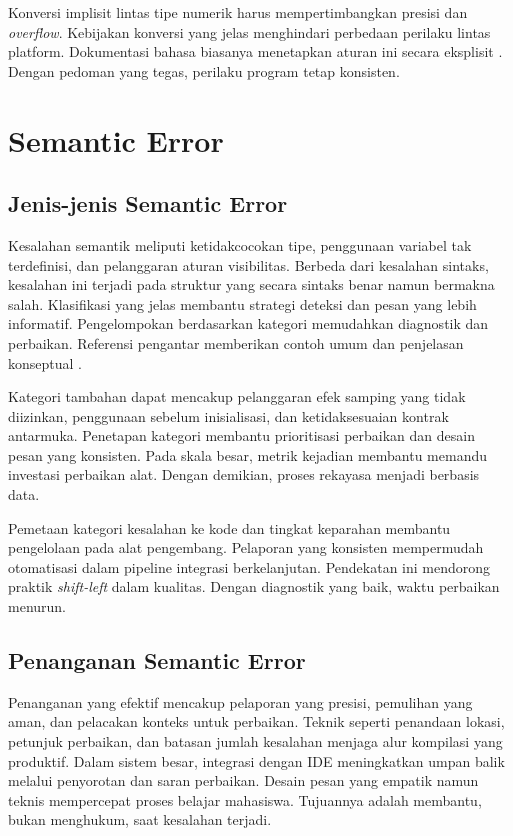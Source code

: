 \documentclass[../main.tex]{subfiles}
\begin{document}
Konversi implisit lintas tipe numerik harus mempertimbangkan presisi dan \emph{overflow}. Kebijakan konversi yang jelas menghindari perbedaan perilaku lintas platform. Dokumentasi bahasa biasanya menetapkan aturan ini secara eksplisit \citep{WikiCoercion}. Dengan pedoman yang tegas, perilaku program tetap konsisten.

\section{Semantic Error}
\subsection{Jenis-jenis Semantic Error}
Kesalahan semantik meliputi ketidakcocokan tipe, penggunaan variabel tak terdefinisi, dan pelanggaran aturan visibilitas. Berbeda dari kesalahan sintaks, kesalahan ini terjadi pada struktur yang secara sintaks benar namun bermakna salah. Klasifikasi yang jelas membantu strategi deteksi dan pesan yang lebih informatif. Pengelompokan berdasarkan kategori memudahkan diagnostik dan perbaikan. Referensi pengantar memberikan contoh umum dan penjelasan konseptual \citep{WikiSemanticError}.

Kategori tambahan dapat mencakup pelanggaran efek samping yang tidak diizinkan, penggunaan sebelum inisialisasi, dan ketidaksesuaian kontrak antarmuka. Penetapan kategori membantu prioritisasi perbaikan dan desain pesan yang konsisten. Pada skala besar, metrik kejadian membantu memandu investasi perbaikan alat. Dengan demikian, proses rekayasa menjadi berbasis data.

Pemetaan kategori kesalahan ke kode dan tingkat keparahan membantu pengelolaan pada alat pengembang. Pelaporan yang konsisten mempermudah otomatisasi dalam pipeline integrasi berkelanjutan. Pendekatan ini mendorong praktik \emph{shift-left} dalam kualitas. Dengan diagnostik yang baik, waktu perbaikan menurun.

\subsection{Penanganan Semantic Error}
Penanganan yang efektif mencakup pelaporan yang presisi, pemulihan yang aman, dan pelacakan konteks untuk perbaikan. Teknik seperti penandaan lokasi, petunjuk perbaikan, dan batasan jumlah kesalahan menjaga alur kompilasi yang produktif. Dalam sistem besar, integrasi dengan IDE meningkatkan umpan balik melalui penyorotan dan saran perbaikan. Desain pesan yang empatik namun teknis mempercepat proses belajar mahasiswa. Tujuannya adalah membantu, bukan menghukum, saat kesalahan terjadi.
\end{document}
